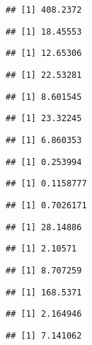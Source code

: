 \documentclass[
]{article}
\begin{document}
\begin{verbatim}
## [1] 408.2372
\end{verbatim}

\begin{verbatim}
## [1] 18.45553
\end{verbatim}

\begin{verbatim}
## [1] 12.65306
\end{verbatim}

\begin{verbatim}
## [1] 22.53281
\end{verbatim}

\begin{verbatim}
## [1] 8.601545
\end{verbatim}

\begin{verbatim}
## [1] 23.32245
\end{verbatim}

\begin{verbatim}
## [1] 6.860353
\end{verbatim}

\begin{verbatim}
## [1] 0.253994
\end{verbatim}

\begin{verbatim}
## [1] 0.1158777
\end{verbatim}

\begin{verbatim}
## [1] 0.7026171
\end{verbatim}

\begin{verbatim}
## [1] 28.14886
\end{verbatim}

\begin{verbatim}
## [1] 2.10571
\end{verbatim}

\begin{verbatim}
## [1] 8.707259
\end{verbatim}

\begin{verbatim}
## [1] 168.5371
\end{verbatim}

\begin{verbatim}
## [1] 2.164946
\end{verbatim}

\begin{verbatim}
## [1] 7.141062
\end{verbatim}
\end{document}
